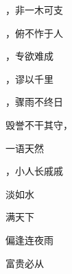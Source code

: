 \documentclass[12pt, a4paper, addpoints]{exam}
\begin{document}
\begin{multicols}{2}
\begin{questions}
\question[2] \uline{\qquad\qquad\qquad}，非一木可支

\question[2] \uline{\qquad\qquad\qquad}，俯不怍于人

\question[2] \uline{\qquad\qquad\qquad}，专欲难成

\question[2] \uline{\qquad\qquad\qquad}，谬以千里

\question[2] \uline{\qquad\qquad\qquad}，骤雨不终日

\question[2] 毁誉不干其守，\uline{\qquad\qquad\qquad}

\question[2] 一语天然\uline{\qquad\qquad\qquad}

\question[2] \uline{\qquad\qquad\qquad}，小人长戚戚

\question[2] \uline{\qquad\qquad\qquad}淡如水

\question[2] \uline{\qquad\qquad\qquad}满天下

\question[2] \uline{\qquad\qquad\qquad}偏逢连夜雨

\question[2] 富贵必从\uline{\qquad\qquad\qquad}

\end{questions}
\end{multicols}
\end{document}
